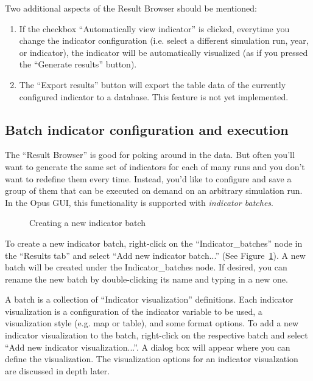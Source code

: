 Two additional aspects of the Result Browser should be mentioned:
\begin{enumerate}
  \item If the checkbox ``Automatically view indicator'' is
  clicked, everytime you change the indicator configuration (i.e.
  select a different simulation run, year, or indicator), the
  indicator will be automatically visualized (as if you pressed the
  ``Generate results'' button). 
  \item The ``Export results'' button will export the table data
  of the currently configured indicator to a database. This feature
  is not yet implemented. 
\end{enumerate}

\subsection{Batch indicator configuration and execution}
\label{sec:batch-indicator-configuration}

The ``Result Browser'' is good for poking around in the
data. But often you'll want to generate the same
set of indicators for each of many runs and you don't want to
redefine them every time. Instead, you'd like to configure and save a
group of them that can be executed on demand on an arbitrary
simulation run. In the Opus GUI, this functionality is supported with
\emph{indicator batches}. 

\begin{figure}[tp]
\begin{center}
\end{center}
\caption{Creating a new indicator batch}
\label{fig:results-manager-new-batch}
\end{figure}

To create a new indicator batch, right-click on the
 ``Indicator\_batches'' node in the ``Results tab'' and select
 ``Add new indicator batch...'' (See
Figure~\ref{fig:results-manager-new-batch}). A new batch will be
created under the Indicator\_batches node. If desired, you can rename the new
batch by double-clicking its name and typing in a new one.

A batch is a collection of ``Indicator visualization''
definitions. Each indicator visualization is a configuration of
the indicator variable to be used, a visualization style (e.g. map or
table), and some format options. To add a new indicator visualization
to the batch, right-click on the respective batch and select
``Add new indicator visualization...''. A dialog box will
appear where you can define the visualization. The visualization
options for an indicator visualzation are discussed in depth later.

